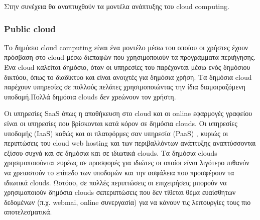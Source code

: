 	Στην συνέχεια θα αναπτυχθούν τα μοντέλα ανάπτυξης του cloud computing.
	\subsubsection{Public cloud}
	
 
		Το δημόσιο cloud computing είναι ένα μοντέλο μέσω του οποίου οι χρήστες έχουν πρόσβαση στο cloud μέσω διεπαφών που χρησιμοποιούν τα προγράμματα περιήγησης. Ένα cloud καλείται δημόσιο, όταν οι υπηρεσίες του παρέχονται μέσω ενός δημόσιου δικτύου, όπως το διαδίκτυο και είναι ανοιχτές για δημόσια χρήση. Τα δημόσια cloud παρέχουν υπηρεσίες σε πολλούς πελάτες χρησιμοποιώντας την ίδια διαμοιραζόμενη υποδομή.Πολλά δημόσια clouds δεν χρεώνουν τον χρήστη.
		
		 Οι υπηρεσίες SaaS όπως η αποθήκευση στο cloud και οι online εφαρμογές γραφείου είναι οι υπηρεσίες που βρίσκονται κατά κόρον σε δημόσια clouds. Οι υπηρεσίες υποδομής (IaaS) καθώς και οι πλατφόρμες σαν υπηρεσία (PaaS) , κυριώς οι περιπτώσεις του cloud web hosting και των περιβαλλόντων ανάπτυξης αναπτύσσονται εξίσου συχνά και σε δημόσια και σε ιδιωτικά clouds. Τα δημόσια clouds  χρησιμοποιούνται ευρέως σε προσφορές για ιδιώτες οι οποίοι είναι λιγότερο πιθανόν να χρειαστούν το επίπεδο των υποδομών και την ασφάλεια που προσφέρουν τα ιδιωτικά clouds. Ωστόσο, σε πολλές περιπτώσεις οι επιχειρήσεις μπορούν να χρησιμοποιούν δημόσια clouds σεπεριπτώσεις που δεν τίθεται θέμα ευαίσθητων δεδομένων (π.χ. webmai, online συνεργασία) για να κάνουν τις λειτουργίες τους πιο αποτελεσματικά.	\cite{characteristics}

